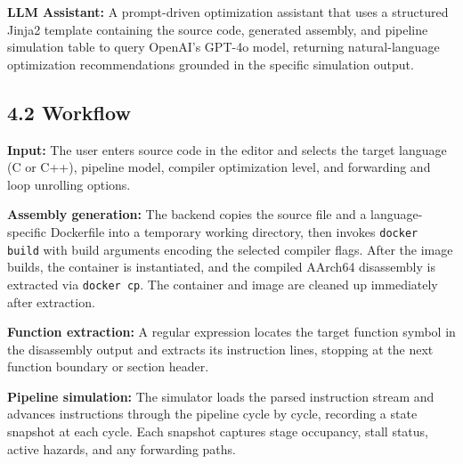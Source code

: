\textbf{LLM Assistant:} A prompt-driven optimization assistant that uses a structured Jinja2 template containing the source code, generated assembly, and pipeline simulation table to query OpenAI's GPT-4o model, returning natural-language optimization recommendations grounded in the specific simulation output.

\subsection*{4.2 Workflow}


\textbf{Input:} The user enters source code in the editor and selects the target language (C or C++), pipeline model, compiler optimization level, and forwarding and loop unrolling options.

\textbf{Assembly generation:} The backend copies the source file and a language-specific Dockerfile into a temporary working directory, then invokes \texttt{docker build} with build arguments encoding the selected compiler flags. After the image builds, the container is instantiated, and the compiled AArch64 disassembly is extracted via \texttt{docker cp}. The container and image are cleaned up immediately after extraction.

\textbf{Function extraction:} A regular expression locates the target function symbol in the disassembly output and extracts its instruction lines, stopping at the next function boundary or section header.

\textbf{Pipeline simulation:} The simulator loads the parsed instruction stream and advances instructions through the pipeline cycle by cycle, recording a state snapshot at each cycle. Each snapshot captures stage occupancy, stall status, active hazards, and any forwarding paths.


